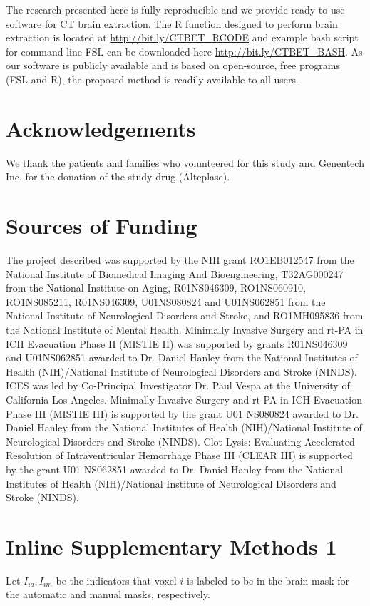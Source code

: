 \documentclass{elsarticle}\usepackage[]{graphicx}\usepackage[]{color}
\begin{document}
%

The research presented here is fully reproducible and we provide ready-to-use software for CT brain extraction. The R function designed to perform brain extraction is located at
\url{http://bit.ly/CTBET_RCODE} and example bash script for command-line FSL can be downloaded here \url{http://bit.ly/CTBET_BASH}.  As our software is publicly available and is based on open-source, free programs (FSL and R), the proposed method is readily available to all users.

\section*{Acknowledgements}
We thank the patients and families who volunteered for this study and Genentech Inc. for the donation of the study drug (Alteplase).

\section*{Sources of Funding}
The project described was supported by the NIH grant RO1EB012547 from the National Institute of Biomedical Imaging And Bioengineering, T32AG000247 from the National Institute on Aging, R01NS046309, RO1NS060910, RO1NS085211, R01NS046309, U01NS080824 and U01NS062851 from the National Institute of Neurological Disorders and Stroke, and RO1MH095836 from the National Institute of Mental Health. Minimally Invasive Surgery and rt-PA in ICH Evacuation Phase II (MISTIE II) was supported by grants R01NS046309 and U01NS062851 awarded to Dr. Daniel Hanley from the National Institutes of Health (NIH)/National Institute of Neurological Disorders and Stroke (NINDS).  ICES was led by Co-Principal Investigator Dr. Paul Vespa at the University of California Los Angeles. Minimally Invasive Surgery and rt-PA in ICH Evacuation Phase III (MISTIE III) is supported by the grant U01 NS080824 awarded to Dr. Daniel Hanley from the National Institutes of Health (NIH)/National Institute of Neurological Disorders and Stroke (NINDS). Clot Lysis: Evaluating Accelerated Resolution of Intraventricular Hemorrhage Phase III (CLEAR III) is supported by the grant U01 NS062851 awarded to Dr. Daniel Hanley from the National Institutes of Health (NIH)/National Institute of Neurological Disorders and Stroke (NINDS). 

\newpage
\section*{Inline Supplementary Methods 1}
Let $I_{ia}, I_{im}$ be the indicators that voxel $i$ is labeled to be in the brain mask for the automatic and manual masks, respectively.  
\end{document}
